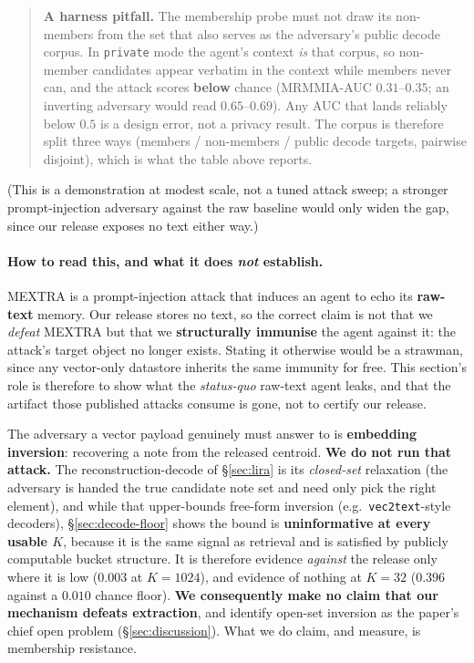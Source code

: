 \documentclass[pdflatex,sn-mathphys-num,12pt]{sn-jnl}
\theoremstyle{thmstyleone}%
\theoremstyle{thmstyletwo}%
\theoremstyle{thmstylethree}%
\newcommand{\secref}[1]{\S\ref{#1}}
\begin{document}
\begin{quote}
\textbf{A harness pitfall.} The membership probe must not draw its non-members from the set that
also serves as the adversary's public decode corpus. In \texttt{private} mode the agent's context
\emph{is} that corpus, so non-member candidates appear verbatim in the context while members never
can, and the attack scores \textbf{below} chance (MRMMIA-AUC $0.31$--$0.35$; an inverting adversary
would read $0.65$--$0.69$). Any AUC that lands reliably below $0.5$ is a design error, not a
privacy result. The corpus is therefore split three ways (members / non-members / public decode
targets, pairwise disjoint), which is what the table above reports.
\end{quote}

(This is a demonstration at modest scale, not a tuned attack sweep; a stronger prompt-injection
adversary against the raw baseline would only widen the gap, since our release exposes no text
either way.)

\paragraph{How to read this, and what it does \emph{not} establish.} MEXTRA is a
prompt-injection attack that induces an agent to echo its \textbf{raw-text} memory. Our release
stores no text, so the correct claim is not that we \emph{defeat} MEXTRA but that we
\textbf{structurally immunise} the agent against it: the attack's target object no longer exists.
Stating it otherwise would be a strawman, since any vector-only datastore inherits the same
immunity for free. This section's role is therefore to show what the \emph{status-quo} raw-text
agent leaks, and that the artifact those published attacks consume is gone, not to certify our
release.

The adversary a vector payload genuinely must answer to is \textbf{embedding inversion}:
recovering a note from the released centroid. \textbf{We do not run that attack.} The
reconstruction-decode of \secref{sec:lira} is its \emph{closed-set} relaxation (the adversary
is handed the true candidate note set and need only pick the right element), and while that
upper-bounds free-form inversion (e.g.\ \texttt{vec2text}-style decoders), \secref{sec:decode-floor}
shows the bound is \textbf{uninformative at every usable $K$}, because it is the same signal as
retrieval and is satisfied by publicly computable bucket structure. It is therefore evidence
\emph{against} the release only where it is low ($0.003$ at $K = 1024$), and evidence of nothing
at $K = 32$ ($0.396$ against a $0.010$ chance floor). \textbf{We consequently make no claim that
our mechanism defeats extraction}, and identify open-set inversion as the paper's chief open
problem (\secref{sec:discussion}). What we do claim, and measure, is membership resistance.
\end{document}
